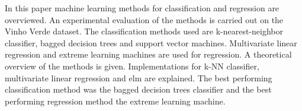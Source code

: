 \noindent In this paper machine learning methods for classification and regression are overviewed. An experimental evaluation of the methods is carried out on the Vinho Verde dataset. The classification methods used are k-nearest-neighbor classifier, bagged decision trees and support vector machines. Multivariate linear regression and extreme learning machines are used for regression. A theoretical overview of the methods is given. Implementations for k-NN classifier, multivariate linear regression and elm are explained. The best performing classification method was the bagged decision trees classifier and the best performing regression method the extreme learning machine.

